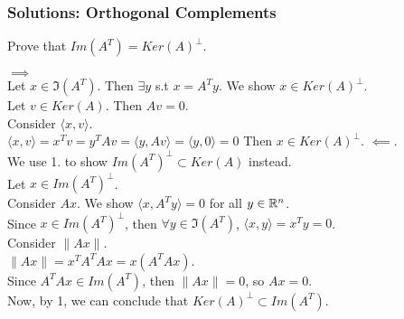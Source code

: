 \documentclass{beamer}
\renewenvironment{enumerate}%
{\begin{list}{\arabic{enumi}.}%
      {\setlength{\leftmargin}{2.5em}%
       \setlength{\itemsep}{-\parsep}%
       \setlength{\topsep}{-\parskip}%
       \usecounter{enumi}}%
 }{\end{list}}
\begin{document}
\begin{frame}
\frametitle{Solutions: Orthogonal Complements}
\begin{enumerate}
\item[2.] Prove that $Im(A^T) = Ker(A)^\perp$.
\end{enumerate}
\begin{solution}
$\implies$ \\
Let $x\in \Im(A^T)$. Then $\exists y$ s.t $x = A^Ty$. We show $x\in Ker(A)^\perp$.\\
Let $v\in Ker(A)$. Then $Av=0$. \\
Consider $\langle x,v \rangle$. \\
\qquad $\langle x,v \rangle = x^Tv = y^TAv =\langle y,Av \rangle =\langle y,0 \rangle = 0$
Then $x\in Ker(A)^\perp$.
$\impliedby$.\\
We use 1. to show $Im(A^T)^\perp \subset Ker(A)$ instead.\\
Let $x\in Im(A^T)^\perp$. \\
Consider $Ax$. We show $\langle x,A^Ty \rangle = 0$ for all $y\in \mathbb{R}^n$. \\
Since $x\in Im(A^T)^\perp$, then $\forall y\in \Im(A^T)$, $\langle x,y \rangle = x^Ty = 0$.\\
Consider $\|Ax\|$.\\ 
\qquad $\|Ax\| = x^TA^TAx = x(A^TAx)$.\\
Since $A^TAx \in Im(A^T)$, then $\|Ax\| = 0$, so $Ax=0$.\\ 
Now, by 1, we can conclude that $Ker(A)^\perp \subset Im(A^T)$.

\end{solution}
\end{frame}
\end{document}
